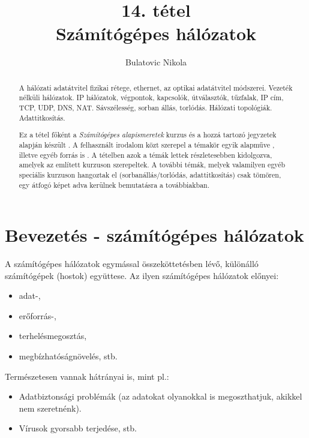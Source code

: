 \documentclass[12pt]{article}
\theoremstyle{plain}
\begin{document}
\title{14. tétel \\ Számítógépes hálózatok}
\author{Bulatovic Nikola}

\maketitle

\begin{abstract}
    A hálózati adatátvitel fizikai rétege, ethernet, az optikai adatátvitel módszerei. Vezeték nélküli hálózatok. IP hálózatok, végpontok, kapcsolók, útválasztók, tűzfalak, IP cím, TCP, UDP, DNS, NAT. Sávszélesség, sorban állás, torlódás. Hálózati topológiák. Adattitkosítás. \par
    Ez a tétel főként a \textit{Számítógépes alapismeretek} kurzus és a hozzá tartozó jegyzetek alapján készült \cite{szamalap1, szamalap2}. A felhasznált irodalom közt szerepel a témakör egyik alapműve \cite{tanenbaum}, illetve egyéb forrás is \cite{magyar}. A tételben azok a témák lettek részletesebben kidolgozva, amelyek az említett kurzuson szerepeltek. A további témák, melyek valamilyen egyéb speciális kurzuson hangoztak el (sorbanállás/torlódás, adattitkosítás) csak tömören, egy átfogó képet adva kerülnek bemutatásra a továbbiakban. 

\end{abstract}

\tableofcontents
\newpage

\section{Bevezetés - számítógépes hálózatok}

A számítógépes hálózatok egymással összeköttetésben lévő, különálló számítógépek (hostok) együttese. Az ilyen számítógépes hálózatok előnyei:
\begin{itemize}
\setlength\itemsep{-0.2em}
    \item adat-,
    \item erőforrás-,
    \item terhelésmegosztás, 
    \item megbízhatóságnövelés, stb.
\end{itemize}{}
Természetesen vannak hátrányai is, mint pl.:
\begin{itemize}
\setlength\itemsep{-0.2em}
    \item Adatbiztonsági problémák (az adatokat olyanokkal is megoszthatjuk, akikkel nem szeretnénk).
    \item Vírusok gyorsabb terjedése, stb.
\end{itemize}{}
\end{document}
